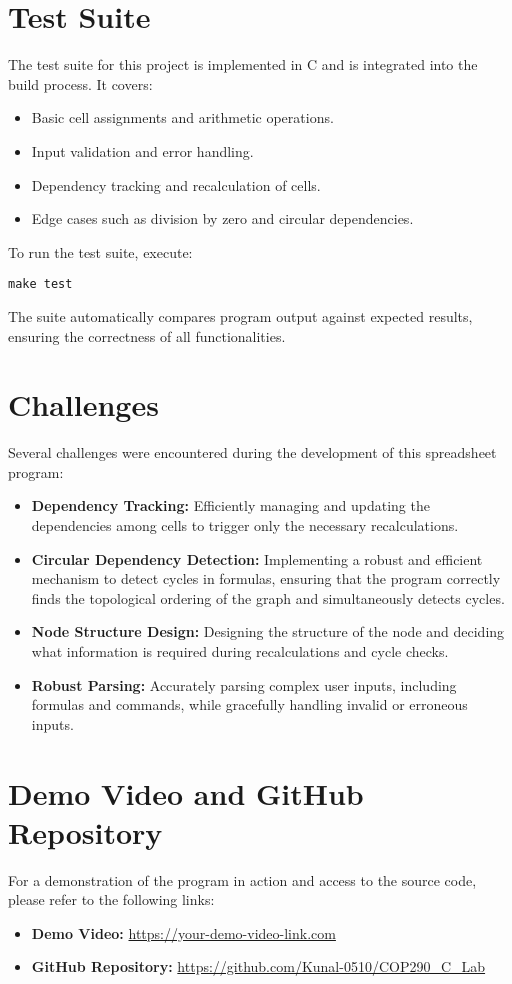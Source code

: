 \documentclass[a4paper,12pt,oneside]{article}
\begin{document}
\section{Test Suite}
The test suite for this project is implemented in C and is integrated into the build process. It covers:
\begin{itemize}
    \item Basic cell assignments and arithmetic operations.
    \item Input validation and error handling.
    \item Dependency tracking and recalculation of cells.
    \item Edge cases such as division by zero and circular dependencies.
\end{itemize}
To run the test suite, execute:
\begin{verbatim}
make test
\end{verbatim}
The suite automatically compares program output against expected results, ensuring the correctness of all functionalities.

\section{Challenges}
Several challenges were encountered during the development of this spreadsheet program:
\begin{itemize}
    \item \textbf{Dependency Tracking:} Efficiently managing and updating the dependencies among cells to trigger only the necessary recalculations.
    \item \textbf{Circular Dependency Detection:} Implementing a robust and efficient mechanism to detect cycles in formulas, ensuring that the program correctly finds the topological ordering of the graph and simultaneously detects cycles.
    \item \textbf{Node Structure Design:} Designing the structure of the node and deciding what information is required during recalculations and cycle checks.
    \item \textbf{Robust Parsing:} Accurately parsing complex user inputs, including formulas and commands, while gracefully handling invalid or erroneous inputs.
\end{itemize}

\section{Demo Video and GitHub Repository}
For a demonstration of the program in action and access to the source code, please refer to the following links:
\begin{itemize}
    \item \textbf{Demo Video:} \url{https://your-demo-video-link.com}
    \item \textbf{GitHub Repository:} \url{https://github.com/Kunal-0510/COP290_C_Lab}
\end{itemize}
\end{document}
